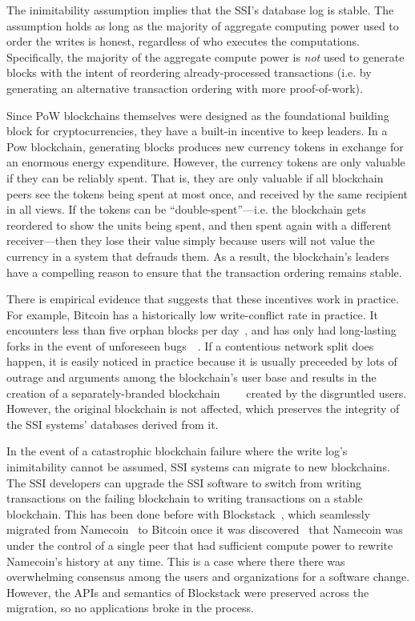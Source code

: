 The inimitability assumption implies that the SSI's database log is stable.
The assumption holds as long as the
majority of aggregate computing power used to order the writes is honest,
regardless of who executes the computations.  Specifically, the majority of the
aggregate compute power is \emph{not} used to generate blocks with the intent of
reordering already-processed transactions (i.e. by generating an alternative
transaction ordering with more proof-of-work).

Since PoW blockchains themselves were designed as the foundational building block for
cryptocurrencies, they have a built-in incentive to keep leaders.
In a Pow blockchain, generating blocks produces
new currency tokens in exchange for an enormous energy expenditure.  However, the
currency tokens are only valuable if they can be reliably
spent.  That is, they are only valuable if all blockchain peers see the tokens
being spent at most once, and received by the same recipient in all views.
If the tokens can be ``double-spent''---i.e. the
blockchain gets reordered to show the units being spent, and
then spent again with a different receiver---then they lose their value simply
because users will not value the currency in a system that defrauds them.  As a
result, the blockchain's leaders have a compelling
reason to ensure that the transaction ordering remains stable.

There is empirical evidence that suggests that these incentives work in practice.  For
example, Bitcoin has a historically low write-conflict rate in practice.  It
encounters less than five orphan blocks per
day~\cite{blockchain-info-orphan-rate}, and has only had long-lasting forks in
the event of unforeseen bugs~\cite{bitcoin-deep-fork}~\cite{bitcoin-cve}.  If a contentious network
split does happen, it is easily noticed in practice because it is usually
preceeded by lots of outrage and arguments among the blockchain's user
base and results in the creation of a
separately-branded
blockchain~\cite{bcash}~\cite{ethereum-classic}~\cite{zcash-classic}~\cite{expanse}
created by the disgruntled users.  However, the original blockchain is not
affected, which preserves the integrity of the SSI systems' databases derived
from it.

In the event of a catastrophic blockchain failure where the write log's inimitability
cannot be assumed, SSI systems can migrate to new blockchains.  The SSI
developers can upgrade the SSI software to switch from writing transactions on
the failing blockchain to writing transactions on a stable blockchain.  This has
been done before with Blockstack~\cite{blockstack-namecoin-migration}, which
seamlessly migrated from Namecoin~\cite{namecoin} to Bitcoin once it was
discovered~\cite{blockstack} that Namecoin was under the control of a single
peer that had sufficient compute power to rewrite Namecoin's history
at any time.  This is a case where there there was overwhelming consensus among
the users and organizations for a software change.  However, the APIs and
semantics of Blockstack were preserved across the migration, so no applications
broke in the process.

